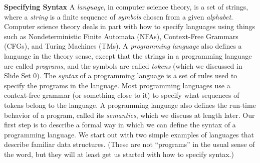 \begin{minipage}[t]{\sw}
\slidenumber
\LARGE
{\bf Specifying Syntax}\exx
A {\em language},
in computer science theory,
is a set of strings,
where a {\em string} is a finite sequence of {\em symbols}
chosen from a given {\em alphabet}.
Computer science theory
deals in part with how to specify languages
using things such as Nondeterministic Finite Automata (NFAs),
Context-Free Grammars (CFGs),
and Turing Machines (TMs).\exx
A {\em programming language}
also defines a language in the theory sense,
except that the strings in a programming language are called {\em programs},
and the symbols are called {\em tokens}
(which we discussed in Slide Set 0).
The {\em syntax} of a programming language is a set
of rules used to specify the programs in the language.
Most programming languages use a context-free grammar
(or something close to it)
to specify what sequences of tokens belong to the language.\exx
A programming language also defines the run-time behavior
of a program, called its {\em semantics},
which we discuss at length later.\exx
Our first step is to describe a formal way in which
we can define the syntax of a programming language.
We start out with two simple examples
of languages that describe familiar data structures.
(These are not ``programs'' in the usual sense of the word,
but they will at least get us started with how
to specify syntax.)
\end{minipage}
\clearpage
